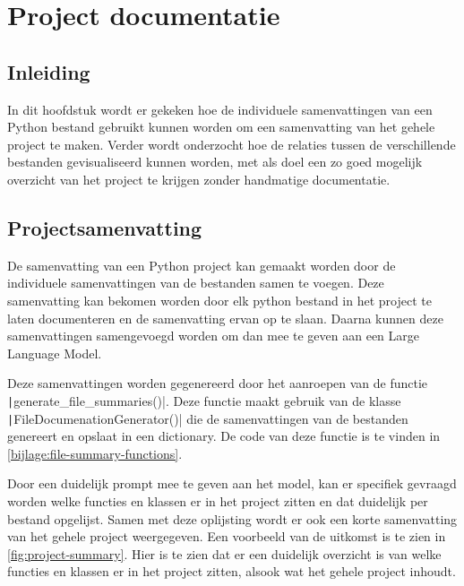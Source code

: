 
\section{Project documentatie}
\label{sec:project-documentatie}

\subsection{Inleiding}
\label{sec:project-documentatie-inleiding}

In dit hoofdstuk wordt er gekeken hoe de individuele samenvattingen van een Python bestand gebruikt kunnen worden om een samenvatting van het gehele project te maken.
Verder wordt onderzocht hoe de relaties tussen de verschillende bestanden gevisualiseerd kunnen worden, met als doel een zo goed mogelijk overzicht van het project te krijgen zonder handmatige documentatie.

\subsection{Projectsamenvatting}
\label{sec:project-documentatie-samenvatting}

De samenvatting van een Python project kan gemaakt worden door de individuele samenvattingen van de bestanden samen te voegen.
Deze samenvatting kan bekomen worden door elk python bestand in het project te laten documenteren en de samenvatting ervan op te slaan.
Daarna kunnen deze samenvattingen samengevoegd worden om dan mee te geven aan een Large Language Model.

Deze samenvattingen worden gegenereerd door het aanroepen van de functie \texttt|generate_file_summaries()|. 
Deze functie maakt gebruik van de klasse \texttt|FileDocumenationGenerator()| die de samenvattingen van de bestanden genereert en opslaat in een dictionary.
De code van deze functie is te vinden in \ref{bijlage:file-summary-functions}.  

Door een duidelijk prompt mee te geven aan het model, kan er specifiek gevraagd worden welke functies en klassen er in het project zitten en dat duidelijk per bestand opgelijst. 
Samen met deze oplijsting wordt er ook een korte samenvatting van het gehele project weergegeven.
Een voorbeeld van de uitkomst is te zien in \ref{fig:project-summary}.
Hier is te zien dat er een duidelijk overzicht is van welke functies en klassen er in het project zitten, alsook wat het gehele project inhoudt.

